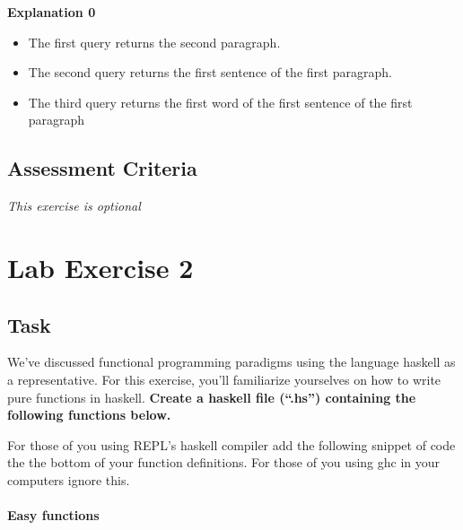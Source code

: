 \textbf{Explanation 0}

\begin{itemize}
\tightlist
\item
  The first query returns the second paragraph.\\
\item
  The second query returns the first sentence of the first paragraph.
\item
  The third query returns the first word of the first sentence of the
  first paragraph
\end{itemize}

\section{Assessment
Criteria}\label{lab-exercise-1-structuring-the-document.md__assessment-criteria}

\emph{This exercise is optional}

\chapter{Lab Exercise
2}\label{lab-exercise-2-exploring-haskell.md__lab-exercise-2}

\section{Task}\label{lab-exercise-2-exploring-haskell.md__task}

We've discussed functional programming paradigms using the language
haskell as a representative. For this exercise, you'll familiarize
yourselves on how to write pure functions in haskell. \textbf{Create a
haskell file (``.hs'') containing the following functions below.}

For those of you using REPL's haskell compiler add the following snippet
of code the the bottom of your function definitions. For those of you
using ghc in your computers ignore this.

\begin{Shaded}
\begin{Highlighting}[]
 \NormalTok{ ()}
\OtherTok{=} \NormalTok{ ()}
\end{Highlighting}
\end{Shaded}

\subsubsection{Easy
functions}\label{lab-exercise-2-exploring-haskell.md__easy-functions}

